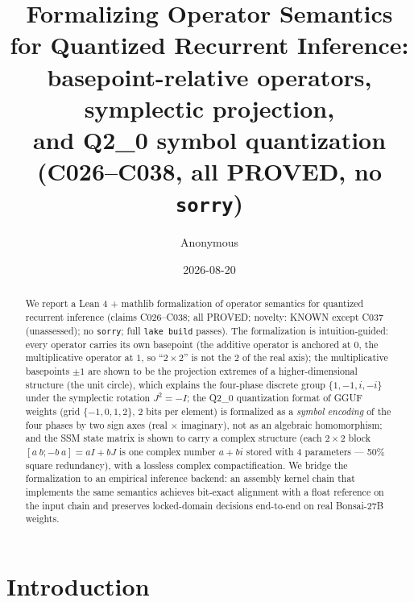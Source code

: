 \documentclass[sigplan,10pt,anonymous,review]{acmart}
\begin{document}
\title{Formalizing Operator Semantics for Quantized Recurrent Inference:\\
basepoint-relative operators, symplectic projection,\\
and Q2\_0 symbol quantization (C026--C038, all PROVED, no \texttt{sorry})}

\author{Anonymous}


\date{2026-08-20}

\begin{abstract}
We report a Lean 4 + mathlib formalization of operator semantics for quantized
recurrent inference (claims C026--C038; all PROVED; novelty: KNOWN except C037
(unassessed); no \texttt{sorry}; full \texttt{lake build} passes). The formalization
is intuition-guided: every operator carries its own basepoint (the additive
operator is anchored at $0$, the multiplicative operator at $1$, so ``$2\times2$''
is not the $2$ of the real axis); the multiplicative basepoints $\pm1$ are shown
to be the projection extremes of a higher-dimensional structure (the unit circle),
which explains the four-phase discrete group $\{1,-1,i,-i\}$ under the symplectic
rotation $J^2=-I$; the Q2\_0 quantization format of GGUF weights (grid
$\{-1,0,1,2\}$, 2 bits per element) is formalized as a \emph{symbol encoding} of
the four phases by two sign axes (real $\times$ imaginary), not as an algebraic
homomorphism; and the SSM state matrix is shown to carry a complex structure
(each $2\times2$ block $[a\ b;-b\ a] = aI + bJ$ is one complex number $a+bi$
stored with 4 parameters --- 50\% square redundancy), with a lossless complex
compactification. We bridge the formalization to an empirical inference backend:
an assembly kernel chain that implements the same semantics achieves
bit-exact alignment with a float reference on the input chain and preserves
locked-domain decisions end-to-end on real Bonsai-27B weights.
\end{abstract}


\maketitle

\section{Introduction}
\end{document}
